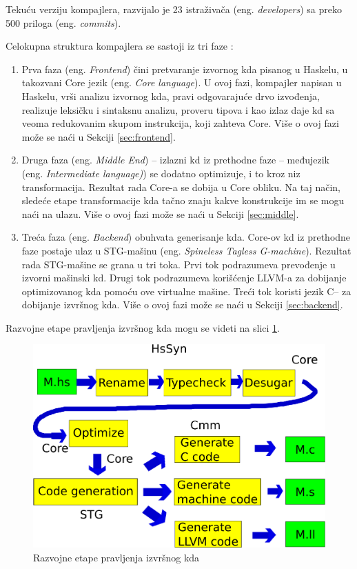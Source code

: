 Tekuću verziju kompajlera, razvijalo je 23 istraživača (eng. \emph{developers}) sa preko 500 priloga (eng. \emph {commits}).

Celokupna struktura kompajlera se sastoji iz tri faze :
\begin{enumerate}
	\item Prva faza (eng. \emph{Frontend}) čini pretvaranje izvornog kda pisanog u Haskelu, u takozvani Core jezik (eng. \emph {Core language}). U ovoj fazi, kompajler napisan u Haskelu, vrši analizu izvornog kda, pravi odgovarajuće drvo izvođenja, realizuje leksičku i sintaksnu analizu, proveru tipova i kao izlaz daje kd sa veoma redukovanim skupom instrukcija, koji zahteva Core. Više o ovoj fazi može se naći u Sekciji \ref{sec:frontend}.
	\item Druga faza (eng. \emph {Middle End}) – izlazni kd iz prethodne faze – međujezik (eng. \emph {Intermediate language)}) se dodatno optimizuje, i to kroz niz transformacija. Rezultat rada Core-a se dobija u Core obliku. Na taj način, sledeće etape transformacije kda tačno znaju kakve konstrukcije im se mogu naći na ulazu.  Više o ovoj fazi može se naći u Sekciji \ref{sec:middle}.
	\item Treća faza (eng. \emph {Backend}) obuhvata generisanje kda. Core-ov kd iz prethodne faze postaje ulaz u STG-mašinu (eng. \emph {Spineless Tagless G-machine}). Rezultat rada STG-mašine se grana u tri toka. Prvi tok podrazumeva prevođenje u izvorni mašinski kd. Drugi tok podrazumeva korišćenje LLVM-a za dobijanje optimizovanog kda pomoću ove virtualne mašine. Treći tok koristi jezik C-- za dobijanje izvršnog kda. Više o ovoj fazi može se naći u Sekciji \ref{sec:backend}.
\end{enumerate}

Razvojne etape pravljenja izvršnog kda mogu se videti na slici \ref{fig:razvojneEtaple}.

\begin{figure}[h!]
	\begin{center}
		\includegraphics[scale=0.30]{resources/razvojneEtape.png}
	\end{center}
	\caption{Razvojne etape pravljenja izvršnog kda}
	\label{fig:razvojneEtaple}
\end{figure}